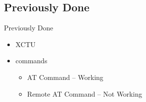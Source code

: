 \documentclass{beamer}
\begin{document}



\subsection{Previously Done}
\begin{frame}{Previously Done}
    \begin{itemize}
    \item XCTU
    \item commands
    \begin{itemize}
        \item AT Command -- Working
        \item Remote AT Command -- Not Working
    \end{itemize}
    \end{itemize}
\end{frame}

\end{document}
